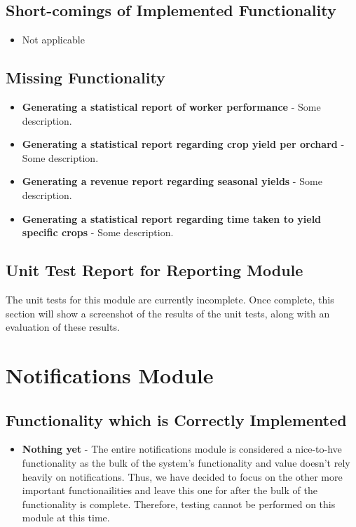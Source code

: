 \documentclass[11pt,fleqn]{book} %
\begin{document}
	\section{Short-comings of Implemented Functionality}
		\begin{itemize}
			\item{Not applicable}
		\end{itemize}
	\section{Missing Functionality}
		\begin{itemize}
			\item\textbf{Generating a statistical report of worker performance} -
			Some description.
			
			\item\textbf{Generating a statistical report regarding crop yield per orchard} -
			Some description.
			
			\item\textbf{Generating a revenue report regarding seasonal yields} -
			Some description.
			
			\item\textbf{Generating a statistical report regarding time taken to yield specific crops} -
			Some description.
		\end{itemize}
	\section{Unit Test Report for Reporting Module}
		The unit tests for this module are currently incomplete. Once complete, this section will show a screenshot of the results of the unit tests, along with an evaluation of these results.
	


\chapter{Notifications Module}
	\section{Functionality which is Correctly Implemented}
		\begin{itemize}
			\item\textbf{Nothing yet} -
			The entire notifications module is considered a nice-to-hve functionality as the bulk of the system's functionality and value doesn't rely heavily on notifications. Thus, we have decided to focus on the other more important functionailities and leave this one for after the bulk of the functionality is complete. Therefore, testing cannot be performed on this module at this time.
		\end{itemize}
\end{document}
